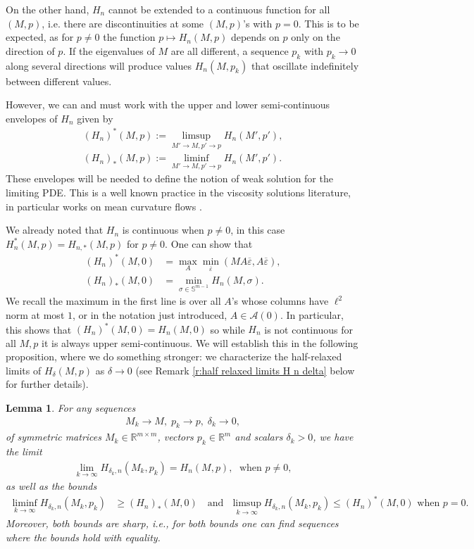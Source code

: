 \documentclass[reqno]{amsart}
\newtheorem{lemma}[theorem]{Lemma}
\numberwithin{equation}{section}
\newcommand{\R}{\mathbb R}
\begin{document}
On the other hand, $H_n$ cannot be extended to a continuous function for all $(M,p)$, i.e. there are discontinuities at some $(M,p)$'s with $p=0$. This is to be expected, as for $p\neq 0$ the function $p\mapsto H_n(M,p)$ depends on $p$ only on the direction of $p$. If the eigenvalues of $M$ are all different, a sequence $p_k$ with $p_k\to 0$ along several directions will produce values $H_n(M,p_k)$ that oscillate indefinitely between different values.

However, we can and must work with the upper and lower semi-continuous envelopes of $H_n$ given by
\begin{align*}
  (H_n)^*(M,p) := \limsup \limits_{M' \to M,p' \to p} H_n(M',p'),\\ (H_n)_*(M,p) := \liminf \limits_{M' \to M,p'\to p} H_n(M',p').
\end{align*}
These envelopes will be needed to define the notion of weak solution for the limiting PDE. This is a well known practice in the viscosity solutions literature, in particular works on mean curvature flows \cite{EvansSpruck1991,ChenGigaGoto1989}.

We already noted that $H_n$ is continuous when $p\neq 0$, in this case $H_n^*(M,p) = H_{n,*}(M,p)$ for $p\neq 0$. One can show that
\begin{align*}
  (H_n)^*(M,0) & = \max_A \min_{\overline \varepsilon}(MA\overline\varepsilon,A\overline\varepsilon),\\
  (H_n)_*(M,0)&  = \min_{\sigma \in \mathbb{S}^{m-1}} H_n(M,\sigma).
\end{align*}
We recall the maximum in the first line is over all $A$'s whose columns have $\ell^2$ norm at most $1$, or in the notation just introduced, $A \in \mathcal{A}(0)$. In particular, this shows that $(H_n)^*(M,0) = H_n(M,0)$ so while $H_n$ is not continuous for all $M,p$ it is always upper semi-continuous. We will establish this in the following proposition, where we do something stronger: we characterize the half-relaxed limits of $H_\delta(M,p)$ as $\delta \to 0$ (see Remark \ref{r:half relaxed limits H n delta} below for further details). 

\begin{lemma}\label{l:liminf and limsup for H delta n}
For any sequences
\begin{align*}
  M_k \to M,\; p_k \to p,\; \delta_k \to 0,    \end{align*}
  of symmetric matrices $M_k \in \R^{m\times m}$, vectors $p_k \in \R^m$ and scalars $\delta_k>0$,
we have the limit
\begin{align*}
  \lim \limits_{k\to \infty} H_{\delta_k,n}(M_k,p_k) = H_n(M,p),\;\text{ when } p \neq 0,
\end{align*}
as well as the bounds
\begin{align*}
  \liminf \limits_{k\to \infty}H_{\delta_k,n}(M_k,p_k) & \geq (H_n)_*(M,0)~~~ \text { and} ~~~
  \limsup \limits_{k\to \infty}H_{\delta_k,n}(M_k,p_k)  \leq (H_n)^*(M,0) \text{ when } p=0.
\end{align*}
Moreover, both bounds are sharp, i.e., for both bounds one can find sequences where the bounds hold with equality.

\end{lemma}
\end{document}
